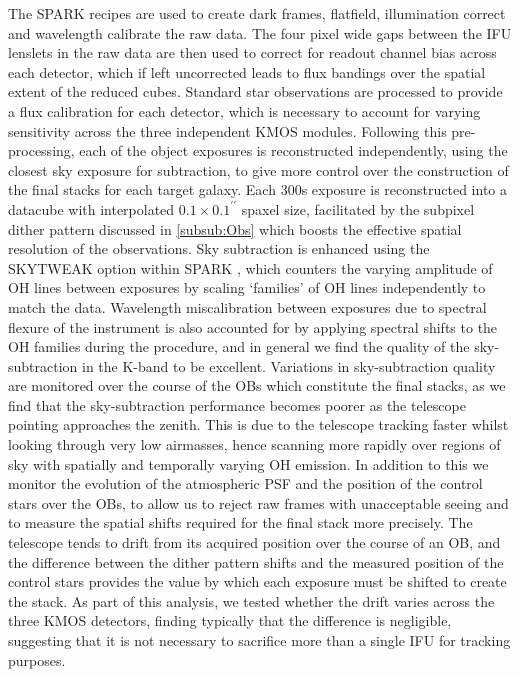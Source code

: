 \documentclass[fleqn,usenatbib]{mn2e}
\begin{document}
The SPARK recipes are used to create dark frames, flatfield, illumination correct and wavelength calibrate the raw data.
The four pixel wide gaps between the IFU lenslets in the raw data are then used to correct for readout channel bias across each detector, which if left uncorrected leads to flux bandings over the spatial extent of the reduced cubes.
Standard star observations are processed to provide a flux calibration for each detector, which is necessary to account for varying sensitivity across the three independent KMOS modules. 
Following this pre-processing, each of the object exposures is reconstructed independently, using the closest sky exposure for subtraction, to give more control over the construction of the final stacks for each target galaxy.
Each 300s exposure is reconstructed into a datacube with interpolated $0.1\times0.1^{\prime\prime}$ spaxel size, facilitated by the subpixel dither pattern discussed in \cref{subsub:Obs} which boosts the effective spatial resolution of the observations.
Sky subtraction is enhanced using the SKYTWEAK option within SPARK \citep{Davies2007}, which counters the varying amplitude of OH lines between exposures by scaling `families' of OH lines independently to match the data.
Wavelength miscalibration between exposures due to spectral flexure of the instrument is also accounted for by applying spectral shifts to the OH families during the procedure, and in general we find the quality of the sky-subtraction in the K-band to be excellent. %
Variations in sky-subtraction quality are monitored over the course of the OBs which constitute the final stacks, as we find that the sky-subtraction performance becomes poorer as the telescope pointing approaches the zenith.
This is due to the telescope tracking faster whilst looking through very low airmasses, hence scanning more rapidly over regions of sky with spatially and temporally varying OH emission.
In addition to this we monitor the evolution of the atmospheric PSF and the position of the control stars over the OBs, to allow us to reject raw frames with unacceptable seeing and to measure the spatial shifts required for the final stack more precisely.
The telescope tends to drift from its acquired position over the course of an OB, and the difference between the dither pattern shifts and the measured position of the control stars provides the value by which each exposure must be shifted to create the stack. %
As part of this analysis, we tested whether the drift varies across the three KMOS detectors, finding typically that the difference is negligible, suggesting that it is not necessary to sacrifice more than a single IFU for tracking purposes.
\end{document}
